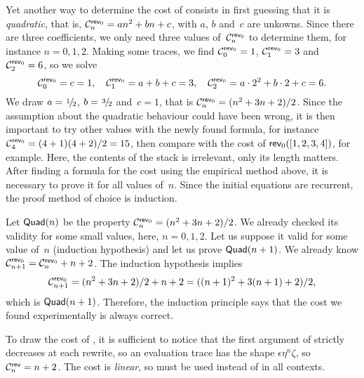 Yet another way to determine the cost of  consists in
first guessing that it is \emph{quadratic}, that is, \(\C{\fun{rev}_0}{n} = an^2 + bn +
c\), with \(a\), \(b\) and~\(c\) are
unkowns.  Since there are three coefficients, we only need three
values of~\(\C{\fun{rev}_0}{n}\) to determine them, for instance
\(n=0, 1, 2\). Making some traces, we find \(\C{\fun{rev}_0}{0} = 1\),
\(\C{\fun{rev}_0}{1} = 3\) and \(\C{\fun{rev}_0}{2} = 6\), so we solve
\begin{equation*}
\C{\fun{rev}_0}{0} = c = 1,\quad
\C{\fun{rev}_0}{1} = a + b + c = 3,\quad
\C{\fun{rev}_0}{2} = a \cdot 2^2 + b \cdot 2 + c = 6.
\end{equation*}
We draw \(a = \myfrac1/2\), \(b = \myfrac3/2\) and~\(c = 1\), that is
\(\C{\fun{rev}_0}{n} = (n^2 + 3n +
2)/2\). Since the assumption about
the quadratic behaviour could have been wrong, it is then important to
try other values with the newly found formula, for instance
\(\C{\fun{rev}_0}{4} = (4+1)(4+2)/2 = 15\), then compare with the cost
of \(\fun{rev}_0([1,2,3,4])\), for
example. Here, the contents of the stack is irrelevant, only its
length matters. After finding a formula for the cost using the
empirical method above, it is necessary to prove it for all values
of~\(n\). Since the initial equations are recurrent, the proof method
of choice is induction.

Let \(\pred{Quad}{n}\) be the property
\(\C{\fun{rev}_0}{n} = (n^2 + 3n + 2)/2\). We already checked its
validity for some small values, here, \(n = 0, 1, 2\). Let us suppose
it valid for some value of~\(n\) (induction hypothesis) and let us
prove \(\pred{Quad}{n+1}\). We already know \(\C{\fun{rev}_0}{n+1} =
\C{\fun{rev}_0}{n} + n + 2\). The
induction hypothesis implies
\begin{equation*}
\C{\fun{rev}_0}{n+1} = (n^2 + 3n + 2)/2 + n + 2
                     = ((n+1)^2 + 3(n+1) + 2)/2,
\end{equation*}
which is \(\pred{Quad}{n+1}\). Therefore,
the induction principle says that the cost we found experimentally is
always correct.

To draw the cost of , it is
sufficient to notice that the first argument of
 strictly decreases at each
rewrite, so an evaluation trace has the shape \(\epsilon\eta^n\zeta\),
so \(\C{\fun{rev}}{n} = n + 2\). The cost is
\emph{linear}, so
 must be used instead of
 in all contexts.

